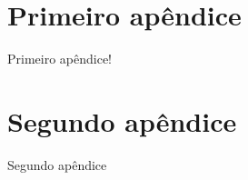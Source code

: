\apendices

\chapter{Primeiro apêndice}
Primeiro apêndice!

\chapter{Segundo apêndice}
Segundo apêndice